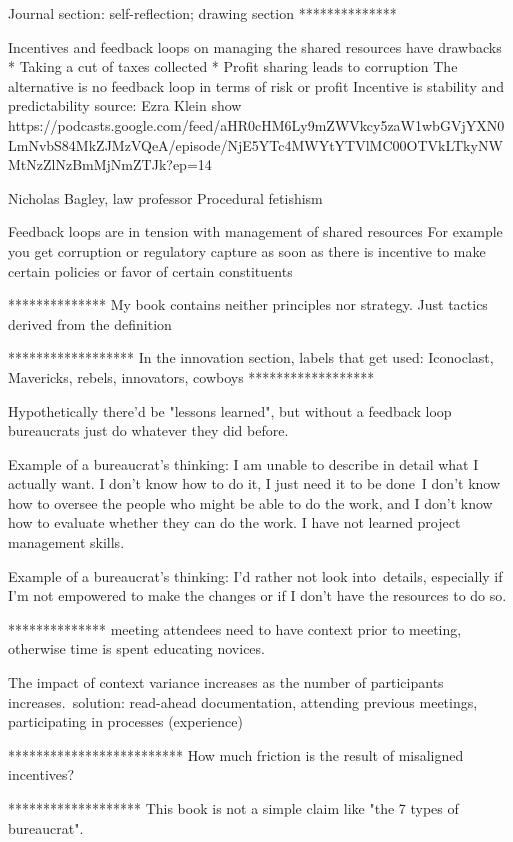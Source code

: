 Journal section: self-reflection; drawing section
**************

Incentives and feedback loops on managing the shared resources have drawbacks
* Taking a cut of taxes collected
* Profit sharing leads to corruption
The alternative is no feedback loop in terms of risk or profit
Incentive is stability and predictability
source:
Ezra Klein show
https://podcasts.google.com/feed/aHR0cHM6Ly9mZWVkcy5zaW1wbGVjYXN0LmNvbS84MkZJMzVQeA/episode/NjE5YTc4MWYtYTVlMC00OTVkLTkyNWMtNzZlNzBmMjNmZTJk?ep=14

Nicholas Bagley, law professor
Procedural fetishism

Feedback loops are in tension with management of shared resources
For example you get corruption or regulatory capture as soon as there is incentive to make certain policies or favor of certain constituents

**************
My book contains neither principles nor strategy. Just tactics derived from the definition

******************
In the innovation section, labels that get used:
Iconoclast, Mavericks, rebels, innovators, cowboys
******************

Hypothetically there'd be "lessons learned", but without a feedback loop bureaucrats just do whatever they did before. 

Example of a bureaucrat's thinking:
I am unable to describe in detail what I actually want. I don't know how to do it, I just need it to be done I don't know how to oversee the people who might be able to do the work, and I don't know how to evaluate whether they can do the work. I have not learned project management skills.

Example of a bureaucrat's thinking:
I'd rather not look into details, especially if I'm not empowered to make the changes or if I don't have the resources to do so.

**************
meeting attendees need to have context prior to meeting, otherwise time is spent educating novices. 

The impact of context variance increases as the number of participants increases. solution: read-ahead documentation, attending previous meetings, participating in processes (experience)

*************************
How much friction is the result of misaligned incentives?

*******************
This book is not a simple claim like "the 7 types of bureaucrat". 

